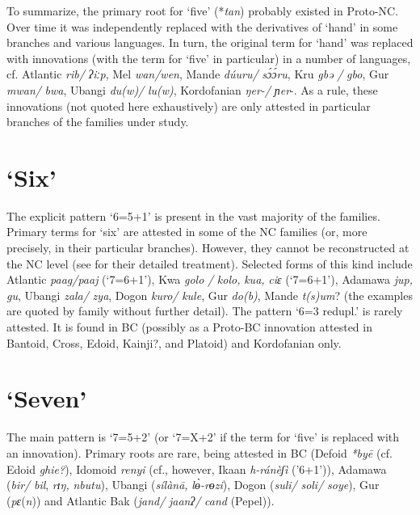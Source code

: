 \newpage 
To summarize, the primary root for ‘five’ (*\textit{tan}) probably existed in Proto-NC. Over time it was independently replaced with the derivatives of ‘hand’ in some branches and various languages. In turn, the original term for ‘hand’ was replaced with innovations (with the term for ‘five’ in particular) in a number of languages, cf. Atlantic \textit{rib/} \textit{ʔiːp}, Mel \textit{wan/wen}, Mande \textit{dúuru/} \textit{s{\'{ɔ}}{\'{ɔ}}ru}, Kru \textit{gbə} \textit{/} \textit{gbo}, Gur \textit{mwan/} \textit{bwa}, Ubangi \textit{du(w)/} \textit{lu(w)}, Kordofanian \textit{ŋer-/} \textit{ɲer}-. As a rule, these innovations (not quoted here exhaustively) are only attested in particular branches of the families under study. 


\section{‘Six’}%
 \largerpage
The explicit pattern ‘6=5+1’ is present in the vast majority of the families. Primary terms for ‘six’ are attested in some of the NC families (or, more precisely, in their particular branches). However, they cannot be reconstructed at the NC level (see  for their detailed treatment). Selected forms of this kind include Atlantic \textit{paag/paaj} (‘7=6+1’), Kwa \textit{golo} \textit{/} \textit{kolo,} \textit{kua,} \textit{ciɛ} (‘7=6+1’), Adamawa \textit{jup,} \textit{gu}, Ubangi \textit{zala/} \textit{zya}, Dogon \textit{kuro/} \textit{kule}, Gur \textit{do(b)}, Mande \textit{t(s)um}? (the examples are quoted by family without further detail). The pattern ‘6=3 redupl.’ is rarely attested. It is found in BC (possibly as a Proto-BC innovation attested in Bantoid, Cross, Edoid, Kainji?, and Platoid) and Kordofanian only.


\section{‘Seven’}%
The main pattern is ‘7=5+2’ (or ‘7=X+2’ if the term for ‘five’ is replaced with an innovation). Primary roots are rare, being attested in BC (Defoid \textit{*by{\={e}}} (cf. Edoid \textit{ghie?}), Idomoid \textit{renyi} (cf., however, Ikaan \textit{h-ránèʃì} ('6+1’)), Adamawa (\textit{bir/} \textit{bil}, \textit{rɪŋ,} \textit{nbutu}), Ubangi (\textit{sílàn{\={a}},} \textit{l{\`{ɵ}}-rɵzi}), Dogon (\textit{suli/} \textit{soli/} \textit{soye}), Gur (\textit{pɛ}(\textit{n})) and Atlantic Bak (\textit{jand/} \textit{jaanʔ/} \textit{cand} (Pepel)).

